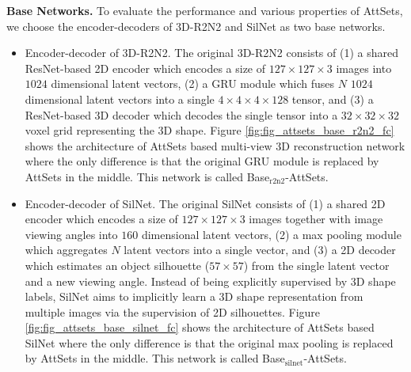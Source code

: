 \documentclass[twocolumn]{svjour3}    \pdfoutput=1
\newcommand{\nickname}{AttSets}
\begin{document}
\textbf{Base Networks.} To evaluate the performance and various properties of \nickname{}, we choose the encoder-decoders of 3D-R2N2 \citep{Chan2016} and SilNet \citep{Wiles2017} as two base networks. 
\begin{itemize}[leftmargin=0.25cm]
\item Encoder-decoder of 3D-R2N2. The original 3D-R2N2 consists of (1) a shared ResNet-based 2D encoder which encodes a size of $127\times 127 \times 3$ images into $1024$ dimensional latent vectors, (2) a GRU module which fuses $N$ $1024$ dimensional latent vectors into a single $4\times 4\times 4\times 128$ tensor, and (3) a ResNet-based 3D decoder which decodes the single tensor into a $32\times 32\times 32$ voxel grid representing the 3D shape. Figure \ref{fig:fig_attsets_base_r2n2_fc} shows the architecture of \nickname{} based multi-view 3D reconstruction network where the only difference is that the original GRU module is replaced by \nickname{} in the middle. This network is called Base$_{\textrm{r2n2}}$-AttSets.

\item Encoder-decoder of SilNet. The original SilNet consists of (1) a shared 2D encoder which encodes a size of $127\times 127\times 3$ images together with image viewing angles into $160$ dimensional latent vectors, (2) a max pooling module which aggregates $N$ latent vectors into a single vector, and (3) a 2D decoder which estimates an object silhouette ($57\times 57$) from the single latent vector and a new viewing angle. Instead of being explicitly supervised by 3D shape labels, SilNet aims to implicitly learn a 3D shape representation from multiple images via the supervision of 2D silhouettes. Figure \ref{fig:fig_attsets_base_silnet_fc} shows the architecture of \nickname{} based SilNet where the only difference is that the original max pooling is replaced by \nickname{} in the middle. This network is called Base$_{\textrm{silnet}}$-AttSets.

\end{itemize}
\end{document}

